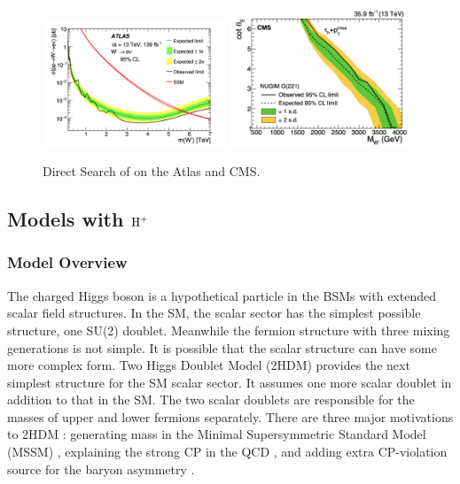 \begin{figure}
    \centering
    \includegraphics[width=0.49\textwidth]{chapters/Physics/sectionBSM/figures/WPrime_search0.png} 
    \includegraphics[width=0.49\textwidth]{chapters/Physics/sectionBSM/figures/WPrime_search.png} 
    \caption{Direct Search of \PWpr on the Atlas and CMS.}
    \label{fig:physics:bsm:WPrime:directSearch}
\end{figure}






\FloatBarrier






\subsection{Models with $\rm H^+$}
\label{sec:physics:bsm:chargedHiggs}

\subsubsection{Model Overview}
The charged Higgs boson \PSHp is a hypothetical particle in the BSMs with extended scalar field structures. In the SM, the scalar sector has the simplest possible structure, one SU(2) doublet. Meanwhile the fermion structure with three mixing generations is not simple. It is possible that the scalar structure can have some more complex form. Two Higgs Doublet Model (2HDM) provides the next simplest structure for the SM scalar sector. It assumes one more scalar doublet in addition to that in the SM. The two scalar doublets are responsible for the masses of upper and lower fermions separately. There are three major motivations to 2HDM \cite{BRANCO20121}: generating mass in the Minimal Supersymmetric Standard Model (MSSM) \cite{HABER198575}, explaining the strong CP in the QCD \cite{KIM19871, PhysRevLett.38.1440}, and adding extra CP-violation source for the baryon asymmetry \cite{Trodden:1998qg, TUROK1991471, Joyce:1994zt}. 

